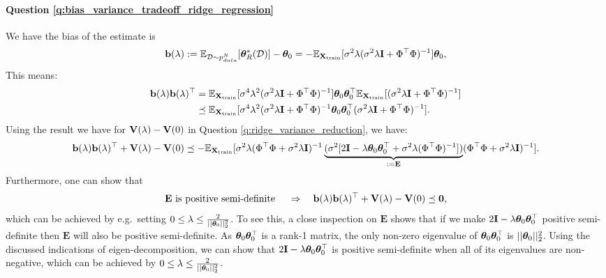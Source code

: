 \paragraph{Question \ref{q:bias_variance_tradeoff_ridge_regression}}
We have the bias of the estimate is
\begin{equation*}
\mathbf{b}(\lambda) := \mathbb{E}_{\mathcal{D} \sim p_{data}^N}[\bm{\theta}^*_R(\mathcal{D})] - \bm{\theta}_0 = - \mathbb{E}_{\mathbf{X}_{\text{train}}}[ \sigma^2 \lambda ( \sigma^2 \lambda \mathbf{I} + \Phi^\top \Phi )^{-1} ] \bm{\theta}_0,
\end{equation*}
This means:
\begin{equation*}
\begin{aligned}
\mathbf{b}(\lambda) \mathbf{b}(\lambda)^\top &= \mathbb{E}_{\mathbf{X}_{\text{train}}}[ \sigma^4 \lambda^2 ( \sigma^2 \lambda \mathbf{I} + \Phi^\top \Phi )^{-1}] \bm{\theta}_0 \bm{\theta}_0^\top  \mathbb{E}_{\mathbf{X}_{\text{train}}}[( \sigma^2 \lambda \mathbf{I} + \Phi^\top \Phi )^{-1} ] \\
&\preceq \mathbb{E}_{\mathbf{X}_{\text{train}}}[ \sigma^4 \lambda^2 ( \sigma^2 \lambda \mathbf{I} + \Phi^\top \Phi )^{-1} \bm{\theta}_0 \bm{\theta}_0^\top ( \sigma^2 \lambda \mathbf{I} + \Phi^\top \Phi )^{-1} ].
\end{aligned}
\end{equation*}
Using the result we have for $\mathbf V(\lambda) - \mathbf V(0)$ in Question \ref{q:ridge_variance_reduction}, we have:
\begin{equation*}
\mathbf{b}(\lambda) \mathbf{b}(\lambda)^\top + \mathbf V(\lambda) - \mathbf V(0) \preceq - \mathbb{E}_{\mathbf{X}_{\text{train}}}[ \sigma^2 \lambda (\Phi^\top \Phi + \sigma^2 \lambda \mathbf{I})^{-1} \underbrace{(\sigma^2 [ 2 \mathbf{I} - \lambda \bm{\theta}_0 \bm{\theta}_0^\top + \sigma^2 \lambda (\Phi^\top \Phi)^{-1}] )}_{:= \mathbf{E}} (\Phi^\top \Phi + \sigma^2 \lambda \mathbf{I})^{-1} ].
\end{equation*} 
Furthermore, one can show that
\begin{equation*}
 \mathbf{E} \text{ is positive semi-definite } \quad \Rightarrow \quad \mathbf{b}(\lambda) \mathbf{b}(\lambda)^\top + \mathbf V(\lambda) - \mathbf V(0) \preceq \bm{0},
\end{equation*}
which can be achieved by e.g.~setting $0 \leq \lambda \leq \frac{2}{|| \bm{\theta}_0 ||_2^2}$. To see this, a close inspection on $\mathbf{E}$ shows that if we make $2 \mathbf{I} - \lambda \bm{\theta}_0 \bm{\theta}_0^\top$ positive semi-definite then $\mathbf{E}$ will also be positive semi-definite. As $\bm{\theta}_0 \bm{\theta}_0^\top$ is a rank-1 matrix, the only non-zero eigenvalue of $\bm{\theta}_0 \bm{\theta}_0^\top$ is $|| \bm{\theta}_0 ||_2^2$. Using the discussed indications of eigen-decomposition, we can show that $2 \mathbf{I} - \lambda \bm{\theta}_0 \bm{\theta}_0^\top$ is positive semi-definite when all of its eigenvalues are non-negative, which can be achieved by $0 \leq \lambda \leq \frac{2}{|| \bm{\theta}_0 ||_2^2}$.


